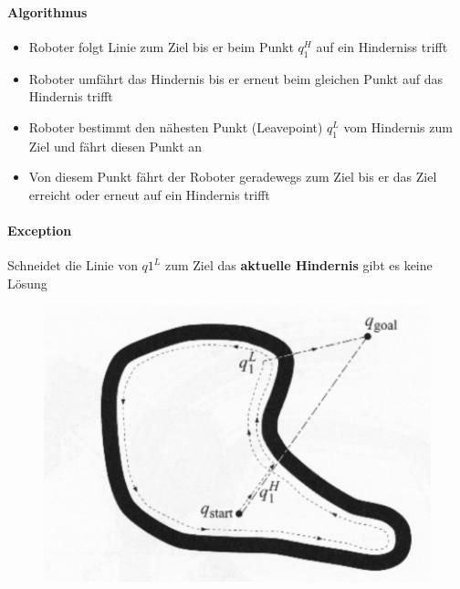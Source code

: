 \paragraph{Algorithmus}
\begin{itemize}
	\item Roboter folgt Linie zum Ziel bis er beim Punkt $q_1^H$ auf ein Hinderniss trifft
	\item Roboter umfährt das Hindernis bis er erneut beim gleichen Punkt auf das Hindernis trifft
	\item Roboter bestimmt den nähesten Punkt (Leavepoint) $q_1^L$ vom Hindernis zum Ziel und fährt diesen Punkt an
	\item Von diesem Punkt fährt der Roboter geradewegs zum Ziel bis er das Ziel erreicht oder erneut auf ein Hindernis trifft
\end{itemize}
\paragraph{Exception}
Schneidet die Linie von $q1^L$ zum Ziel das \textbf{aktuelle Hindernis} gibt es keine Lösung
\begin{figure}[H]
	\begin{center}
		\includegraphics[scale=0.4]{Resources/PNG/Exception1.PNG}
		\caption{}
		\label{fig:PNG/Exception1.PNG}
	\end{center}
\end{figure}
